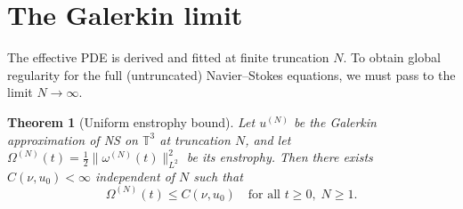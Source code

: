 \documentclass[11pt,a4paper]{article}
\newtheorem{theorem}{Theorem}[section]
\theoremstyle{remark}
\newcommand{\T}{\mathbb{T}}
\begin{document}
\section{The Galerkin limit}\label{sec:galerkin}

The effective PDE is derived and fitted at finite truncation $N$.  To obtain global regularity for the full (untruncated) Navier--Stokes equations, we must pass to the limit $N \to \infty$.

\begin{theorem}[Uniform enstrophy bound]\label{thm:uniform}
Let $u^{(N)}$ be the Galerkin approximation of NS on $\T^3$ at truncation $N$, and let $\Omega^{(N)}(t) = \frac{1}{2}\|\omega^{(N)}(t)\|_{L^2}^2$ be its enstrophy.  Then there exists $C(\nu, u_0) < \infty$ independent of $N$ such that
\[
  \Omega^{(N)}(t) \leq C(\nu, u_0) \quad \text{for all } t \geq 0, \; N \geq 1.
\]
\end{theorem}
\end{document}

